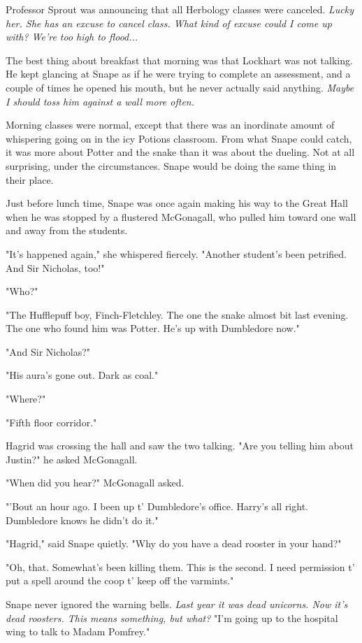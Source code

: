 \documentclass[a4paper,11pt]{article}
\begin{document}
Professor Sprout was announcing that all Herbology classes were canceled. \emph{Lucky her. She has an excuse to cancel class. What kind of excuse could I come up with? We're too high to flood...}

The best thing about breakfast that morning was that Lockhart was not talking. He kept glancing at Snape as if he were trying to complete an assessment, and a couple of times he opened his mouth, but he never actually said anything. \emph{Maybe I should toss him against a wall more often.}

Morning classes were normal, except that there was an inordinate amount of whispering going on in the icy Potions classroom. From what Snape could catch, it was more about Potter and the snake than it was about the dueling. Not at all surprising, under the circumstances. Snape would be doing the same thing in their place.

Just before lunch time, Snape was once again making his way to the Great Hall when he was stopped by a flustered McGonagall, who pulled him toward one wall and away from the students.

"It's happened again," she whispered fiercely. "Another student's been petrified. And Sir Nicholas, too!"

"Who?"

"The Hufflepuff boy, Finch-Fletchley. The one the snake almost bit last evening. The one who found him was Potter. He's up with Dumbledore now."

"And Sir Nicholas?"

"His aura's gone out. Dark as coal."

"Where?"

"Fifth floor corridor."

Hagrid was crossing the hall and saw the two talking. "Are you telling him about Justin?" he asked McGonagall.

"When did you hear?" McGonagall asked.

"'Bout an hour ago. I been up t' Dumbledore's office. Harry's all right. Dumbledore knows he didn't do it."

"Hagrid," said Snape quietly. "Why do you have a dead rooster in your hand?"

"Oh, that. Somewhat's been killing them. This is the second. I need permission t' put a spell around the coop t' keep off the varmints."

Snape never ignored the warning bells. \emph{Last year it was dead unicorns. Now it's dead roosters. This means something, but what?} "I'm going up to the hospital wing to talk to Madam Pomfrey."
\end{document}
